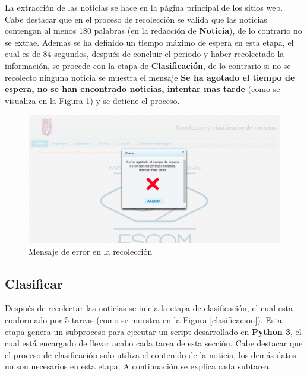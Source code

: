 La extracción de las noticias se hace en la página principal de los sitios web. Cabe destacar que en el proceso de recolección se valida que las noticias contengan al menos 180 palabras (en la redacción de \textbf{Noticia}), de lo contrario no se extrae. Ademas se ha definido un tiempo máximo de espera en esta etapa, el cual es de 84 segundos, después de concluir el periodo y haber recolectado la información, se procede con la etapa de \textbf{Clasificación}, de lo contrario si no se recolecto ninguna noticia se muestra el mensaje \textbf{Se ha agotado el tiempo de espera, no se han encontrado noticias, intentar mas tarde} (como se visualiza en la Figura \ref{fig:notNoRec}) y se detiene el proceso.

\begin{figure}[H]
\centering
\includegraphics[scale=0.29]{imagenes/Capitulo5/errorConectividad.png}
\caption{Mensaje de error en la recolección}
\label{fig:notNoRec}
\end{figure}

\subsection{Clasificar}

Después de recolectar las noticias se inicia la etapa de clasificación, el cual esta conformado por 5 tareas (como se muestra en la Figura \ref{clasificacion}). Esta etapa genera un subproceso para ejecutar un script desarrollado en \textbf{Python 3}, el cual está encargado de llevar acabo cada tarea de esta sección. Cabe destacar que el proceso de clasificación solo utiliza el contenido de la noticia, los demás datos no son necesarios en esta etapa. A continuación se explica cada subtarea.

